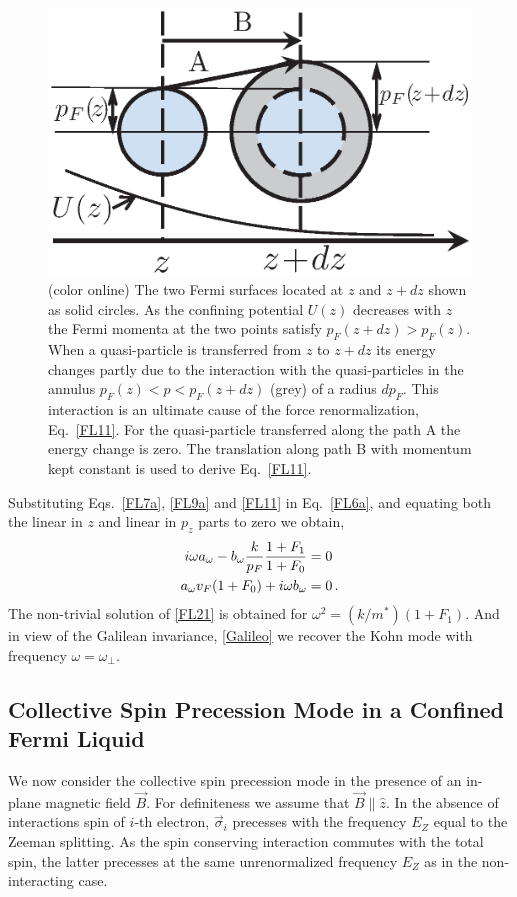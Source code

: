 \begin{figure}[ht!]
\begin{center}
\includegraphics[width=0.5\columnwidth]{fig2.eps}
\caption{ (color online) 
The two Fermi surfaces located at $z$ and $z+dz$ shown as solid circles.
As the confining potential $U(z)$ decreases with $z$ the Fermi momenta at the two points satisfy $p_F(z+dz) > p_F(z)$.
When a quasi-particle is transferred from $z$ to $z+dz$ its energy changes partly due to the interaction with the quasi-particles in the annulus $p_F(z) <  p < p_F(z+dz)$ (grey) of a radius $dp_F$. 
This interaction is an ultimate cause of the force renormalization, Eq.~\eqref{FL11}.
For the quasi-particle transferred along the path A the energy change is zero.
The translation along path B with momentum kept constant is used to derive Eq.~\eqref{FL11}.\cite{Iqbal}}
\label{fig:FL1}
\end{center}
\end{figure}


Substituting Eqs.~\eqref{FL7a}, \eqref{FL9a} and \eqref{FL11} in Eq.~\eqref{FL6a}, and equating both the linear in $z$ and linear in $p_z$ parts to zero we obtain,
\begin{align}\label{FL21}
i \omega a_{\omega} - b_{\omega} \frac{ k}{ p_F}\frac{ 1 + F_1 }{ 1 + F_0}  &= 0
\notag \\
a_{\omega} v_F ( 1 + F_0) + i \omega b_{\omega}   & = 0 \, .
\end{align}
The non-trivial solution of \eqref{FL21} is obtained for $\omega^2 = (k/m^*)(1 + F_1) $.
And in view of the Galilean invariance, \eqref{Galileo}
we recover the Kohn mode with frequency $\omega = \omega_{\perp}$.
%
%
\subsection{Collective Spin Precession Mode in a Confined Fermi Liquid}
\label{sec:Collective_spin}
We now consider the collective spin precession mode in the presence of an in-plane magnetic field $\vec{B}$.
For definiteness we assume that $\vec{B} \parallel \hat{z}$. 
In the absence of interactions spin of $i$-th electron, $\vec{\sigma}_i$ precesses with the frequency $E_Z$ equal to the Zeeman splitting.
As the spin conserving interaction commutes with the total spin, 
the latter precesses at the same unrenormalized frequency $E_Z$ as in the non-interacting case.

